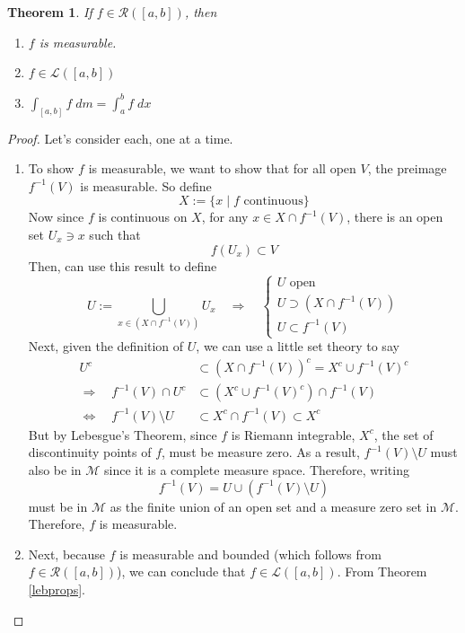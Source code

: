 \documentclass[12pt]{article}
\theoremstyle{plain}
\newtheorem{thm}{Theorem}[subsection]
\theoremstyle{definition}
\theoremstyle{remark}
\begin{document}
\begin{thm}
If $f\in\mathscr{R}([a,b])$, then
\begin{enumerate}
    \item $f$ is measurable.
    \item $f\in\mathscr{L}([a,b])$
    \item $\int_{[a,b]} f \; dm = \int_a^b f \; dx$
\end{enumerate}
\end{thm}
\begin{proof}
Let's consider each, one at a time.
\begin{enumerate}
    
\item To show $f$ is measurable, we want to show that for all open $V$, the preimage $f^{-1}(V)$ is measurable.  So define 
\[
    X := \{x\;|\; \text{$f$ continuous}\} 
\]
Now since $f$ is continuous on $X$, for any $x\in X \cap f^{-1}(V)$, there is an open set $U_x\ni x$ such that 
\[
    f(U_x) \subset V
\]
Then, can use this result to define
\[
    U := \bigcup_{x\in (X\cap f^{-1}(V))} U_x 
    \quad \Rightarrow \quad
    \begin{cases}
        \text{$U$ open} \\
        \text{$U\supset (X \cap f^{-1}(V))$} \\
        \text{$U\subset f^{-1}(V)$} 
    \end{cases}
\]
Next, given the definition of $U$, we can use a little set theory to say
\begin{align*}
    U^c &\subset (X\cap f^{-1}(V))^c 
    = X^c \cup f^{-1}(V)^c  \\
    \Rightarrow \quad
    f^{-1}(V) \cap U^c &\subset 
    \left(X^c \cup f^{-1}(V)^c\right)\cap f^{-1}(V)  \\
    \Leftrightarrow \quad
    f^{-1}(V) \setminus U &\subset
    X^c \cap f^{-1}(V)  \subset X^c 
\end{align*}
But by Lebesgue's Theorem, since $f$ is Riemann integrable, $X^c$, the set of discontinuity points of $f$, must be measure zero. As a result, $f^{-1}(V)\setminus U$ must also be in $\mathscr{M}$ since it is a complete measure space. Therefore, writing 
\[
    f^{-1}(V) = U \cup \left( f^{-1}(V)\setminus U\right)
\]
must be in $\mathscr{M}$ as the finite union of an open set and a measure zero set in $\mathscr{M}$. Therefore, $f$ is measurable.

\item Next, because $f$ is measurable and bounded (which follows from $f\in\mathscr{R}([a,b])$), we can conclude that $f\in\mathscr{L}([a,b])$. From Theorem \ref{lebprops}.


\end{enumerate}
\end{proof}
\end{document}
